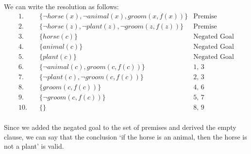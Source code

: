 \documentclass[12pt]{article}
\begin{document}
We can write the resolution as follows:
\begin{align*}
    1. \hspace{1em} & \{ \neg horse(x), \neg animal(x), groom(x, f(x)) \}                                                                   & \text{Premise} \\   
    2. \hspace{1em} & \{ \neg horse(z), \neg plant(z), \neg groom(z, f(z)) \}                                                               & \text{Premise} \\
    3. \hspace{1em} & \{ horse(c) \}                                                                                                        & \text{Negated Goal} \\
    4. \hspace{1em} & \{ animal(c) \}                                                                                                       & \text{Negated Goal} \\
    5. \hspace{1em} & \{ plant(c) \}                                                                                                        & \text{Negated Goal} \\
    6. \hspace{1em} & \{ \neg animal(c), groom(c, f(c)) \}                                                                                  & \text{1, 3} \\
    7. \hspace{1em} & \{ \neg plant(c), \neg groom(c, f(c)) \}                                                                              & \text{2, 3} \\
    8. \hspace{1em} & \{ groom(c, f(c)) \}                                                                                                  & \text{4, 6} \\
    9. \hspace{1em} & \{ \neg groom(c, f(c)) \}                                                                                             & \text{5, 7} \\
    10. \hspace{1em} & \{ \}                                                                                                                & \text{8, 9} \\
\end{align*}

Since we added the negated goal to the set of premises and derived the empty clause, we can say that the conclusion `if the horse is an animal, then the horse is not a plant' is valid.
\end{document}
